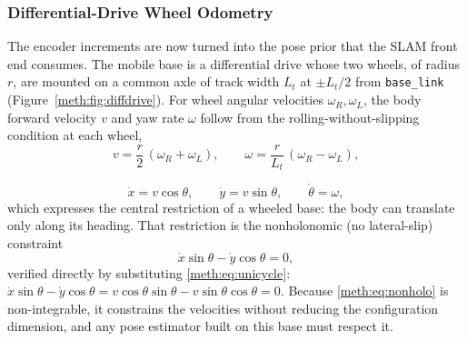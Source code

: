 \subsubsection{Differential-Drive Wheel Odometry}

The encoder increments are now turned into the pose prior that the SLAM front end consumes. The mobile base is a differential drive whose two wheels, of radius $r$, are mounted on a common axle of track width $L_t$ at $\pm L_t/2$ from \texttt{base\_link} (Figure~\ref{meth:fig:diffdrive}). For wheel angular velocities $\omega_R,\omega_L$, the body forward velocity $v$ and yaw rate $\omega$ follow from the rolling-without-slipping condition at each wheel,
\begin{equation}
v = \frac{r}{2}\,(\omega_R + \omega_L),
\qquad
\omega = \frac{r}{L_t}\,(\omega_R - \omega_L),
\label{meth:eq:fk}
\end{equation}

\begin{equation}
\dot{x} = v\cos\theta,
\qquad
\dot{y} = v\sin\theta,
\qquad
\dot{\theta} = \omega,
\label{meth:eq:unicycle}
\end{equation}
which expresses the central restriction of a wheeled base: the body can translate only along its heading. That restriction is the nonholonomic (no lateral-slip) constraint
\begin{equation}
\dot{x}\sin\theta - \dot{y}\cos\theta = 0,
\label{meth:eq:nonholo}
\end{equation}
verified directly by substituting \eqref{meth:eq:unicycle}: $\dot{x}\sin\theta-\dot{y}\cos\theta = v\cos\theta\sin\theta - v\sin\theta\cos\theta = 0$. Because \eqref{meth:eq:nonholo} is non-integrable, it constrains the velocities without reducing the configuration dimension, and any pose estimator built on this base must respect it.

